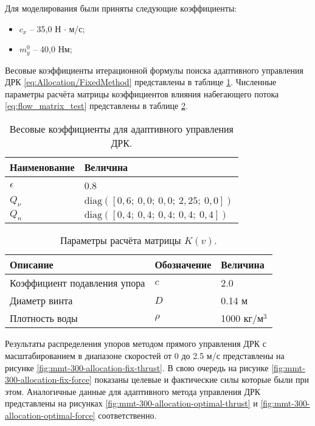 Для моделирования были приняты следующие коэффициенты:
\begin{itemize}
    \item $c_x$ -- 35,0 Н $\cdot$ м/с;
    \item $m_y^0$ -- 40,0 Нм;
\end{itemize}

Весовые коэффициенты итерационной формулы поиска адаптивного управления ДРК \ref{eq:Allocation/FixedMethod} представлены в таблице \ref{tab:weight_coeff}.
Численные параметры расчёта матрицы коэффициентов влияния набегающего потока \ref{eq:flow_matrix_test} представлены в таблице \ref{tab:matrix_flow_coeff}.

\begin{table}
    \caption{Весовые коэффициенты для адаптивного управления ДРК.}
    \label{tab:weight_coeff}
    \centering
    \begin{tabular}{ll}
        \toprule
        Наименование & Величина \\
        \midrule
        $\epsilon$ & 0.8 \\
        $Q_{\nu}$ & $\text{diag}([0,6;\:0,0;\:0,0;\:2,25;\:0,0])$ \\
        $Q_{n}$  & $\text{diag}([0,4;\:0,4;\:0,4;\:0,4;\:0,4])$ \\
        \bottomrule
    \end{tabular}
\end{table}

\begin{table}
    \caption{Параметры расчёта матрицы $K(v)$.}
    \label{tab:matrix_flow_coeff}
    \centering
    \begin{tabular}{lll}
        \toprule
        Описание & Обозначение & Величина \\
        \midrule
        Коэффициент подавления упора & $c$ & 2.0 \\
        Диаметр винта & $D$ & 0.14 м \\
        Плотность воды & $\rho$ & 1000 кг/м$^3$ \\
        \bottomrule
    \end{tabular}
\end{table}

Результаты распределения упоров методом прямого управления ДРК с масштабированием в диапазоне скоростей от 0 до 2.5 м/с представлены на рисунке \ref{fig:mmt-300-allocation-fix-thrust}.
В свою очередь на рисунке \ref{fig:mmt-300-allocation-fix-force} показаны целевые и фактические силы которые были при этом.
Аналогичные данные для адаптивного метода управления ДРК представлены на рисунках \ref{fig:mmt-300-allocation-optimal-thrust} и \ref{fig:mmt-300-allocation-optimal-force} соответственно.

